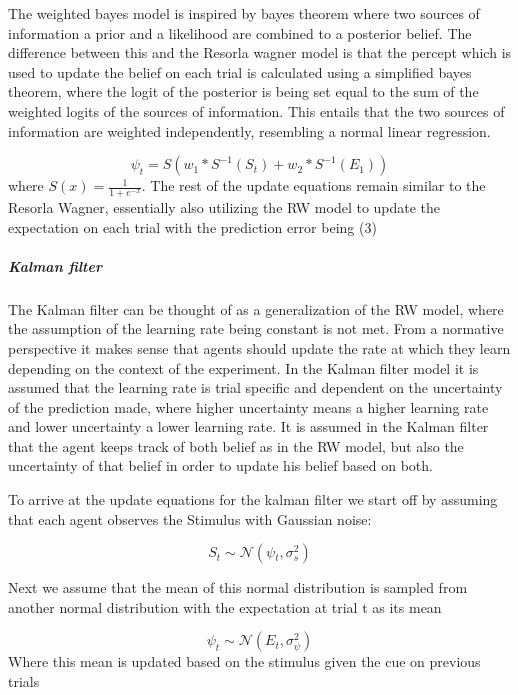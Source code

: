 \documentclass[
]{article}
\begin{document}
The weighted bayes model is inspired by bayes theorem where two sources
of information a prior and a likelihood are combined to a posterior
belief. The difference between this and the Resorla wagner model is that
the percept which is used to update the belief on each trial is
calculated using a simplified bayes theorem, where the logit of the
posterior is being set equal to the sum of the weighted logits of the
sources of information. This entails that the two sources of information
are weighted independently, resembling a normal linear regression.

\[
\begin{equation}
\tag{4}
\psi_t = S(w_1*S^{-1}(S_t)+w_2*S^{-1}(E_1))
\end{equation}
\] where \(S(x) = \frac{1}{1+e^{-x}}\). The rest of the update equations
remain similar to the Resorla Wagner, essentially also utilizing the RW
model to update the expectation on each trial with the prediction error
being (3)

\hypertarget{kalman-filter}{%
\subparagraph{Kalman filter}\label{kalman-filter}}

The Kalman filter can be thought of as a generalization of the RW model,
where the assumption of the learning rate being constant is not met.
From a normative perspective it makes sense that agents should update
the rate at which they learn depending on the context of the experiment.
In the Kalman filter model it is assumed that the learning rate is trial
specific and dependent on the uncertainty of the prediction made, where
higher uncertainty means a higher learning rate and lower uncertainty a
lower learning rate. It is assumed in the Kalman filter that the agent
keeps track of both belief as in the RW model, but also the uncertainty
of that belief in order to update his belief based on both.

To arrive at the update equations for the kalman filter we start off by
assuming that each agent observes the Stimulus with Gaussian noise:

\[
\begin{equation}
\tag{5}
S_t \sim \mathcal{N}{(\psi{_t}, \sigma_s^2)}
\end{equation}
\]

Next we assume that the mean of this normal distribution is sampled from
another normal distribution with the expectation at trial t as its mean

\[
\begin{equation}
\tag{6}
\psi_t \sim \mathcal{N}{(E_t, \sigma_{\psi}^2)}
\end{equation}
\] Where this mean is updated based on the stimulus given the cue on
previous trials
\end{document}
